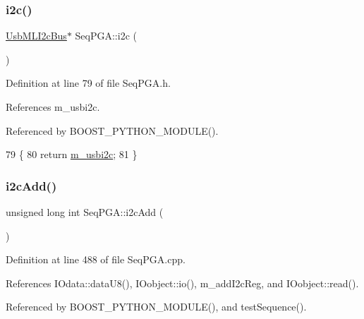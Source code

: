 \subsubsection{\texorpdfstring{i2c()}{i2c()}}
{\footnotesize\ttfamily \hyperlink{classUsbMLI2cBus}{Usb\+M\+L\+I2c\+Bus}$\ast$ Seq\+P\+G\+A\+::i2c (\begin{DoxyParamCaption}{ }\end{DoxyParamCaption})\hspace{0.3cm}{\ttfamily [inline]}}



Definition at line 79 of file Seq\+P\+G\+A.\+h.



References m\+\_\+usbi2c.



Referenced by B\+O\+O\+S\+T\+\_\+\+P\+Y\+T\+H\+O\+N\+\_\+\+M\+O\+D\+U\+L\+E().


\begin{DoxyCode}
79                     \{
80     \textcolor{keywordflow}{return} \hyperlink{classSeqPGA_a31d692cdc2f70dfd71671f3e2d688e20}{m\_usbi2c};
81   \}
\end{DoxyCode}
\mbox{\label{classSeqPGA_a67022684977cb2f6335eb6b21262fe89}} 
\subsubsection{\texorpdfstring{i2c\+Add()}{i2cAdd()}}
{\footnotesize\ttfamily unsigned long int Seq\+P\+G\+A\+::i2c\+Add (\begin{DoxyParamCaption}{ }\end{DoxyParamCaption})}



Definition at line 488 of file Seq\+P\+G\+A.\+cpp.



References I\+Odata\+::data\+U8(), I\+Oobject\+::io(), m\+\_\+add\+I2c\+Reg, and I\+Oobject\+::read().



Referenced by B\+O\+O\+S\+T\+\_\+\+P\+Y\+T\+H\+O\+N\+\_\+\+M\+O\+D\+U\+L\+E(), and test\+Sequence().


